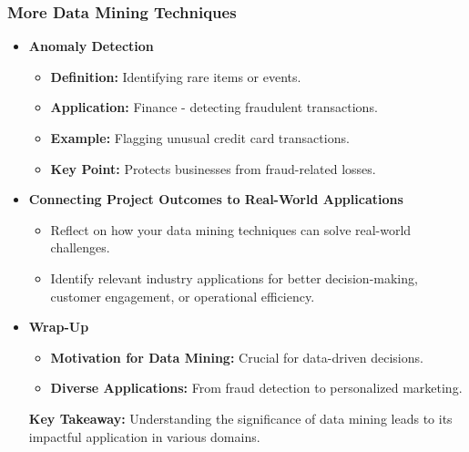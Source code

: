 \documentclass[aspectratio=169]{beamer}
\begin{document}
\begin{frame}[fragile]
    \frametitle{More Data Mining Techniques}
    \begin{itemize}
        \item \textbf{Anomaly Detection}
        \begin{itemize}
            \item \textbf{Definition:} Identifying rare items or events.
            \item \textbf{Application:} Finance - detecting fraudulent transactions.
            \item \textbf{Example:} Flagging unusual credit card transactions.
            \item \textbf{Key Point:} Protects businesses from fraud-related losses.
        \end{itemize}
        
        \item \textbf{Connecting Project Outcomes to Real-World Applications}
        \begin{itemize}
            \item Reflect on how your data mining techniques can solve real-world challenges.
            \item Identify relevant industry applications for better decision-making, customer engagement, or operational efficiency.
        \end{itemize}
    
        \item \textbf{Wrap-Up}
        \begin{itemize}
            \item \textbf{Motivation for Data Mining:} Crucial for data-driven decisions.
            \item \textbf{Diverse Applications:} From fraud detection to personalized marketing.
        \end{itemize}
        \textbf{Key Takeaway:} Understanding the significance of data mining leads to its impactful application in various domains.
    \end{itemize}
\end{frame}
\end{document}
